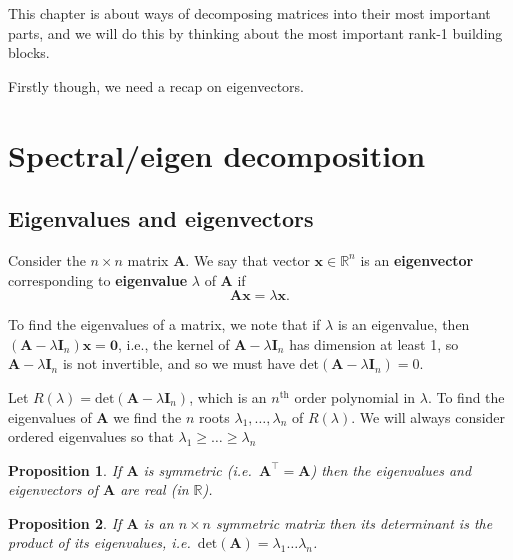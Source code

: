 \documentclass[
]{book}
\newtheorem{proposition}{Proposition}[chapter]
\theoremstyle{definition}
\theoremstyle{definition}
\theoremstyle{definition}
\theoremstyle{definition}
\theoremstyle{remark}
\begin{document}
This chapter is about ways of decomposing matrices into their most important parts, and we will do this by thinking about the most important rank-1 building blocks.

Firstly though, we need a recap on eigenvectors.

\section{Spectral/eigen decomposition}\label{spectraleigen-decomposition}

\subsection{Eigenvalues and eigenvectors}\label{eigenvalues-and-eigenvectors}

Consider the \(n\times n\) matrix \(\mathbf A\).
We say that
vector \(\mathbf x\in \mathbb{R}^n\) is an \textbf{eigenvector} corresponding to \textbf{eigenvalue} \(\lambda\) of \(\mathbf A\) if
\[\mathbf A\mathbf x= \lambda \mathbf x.\]

To find the eigenvalues of a matrix, we note that if \(\lambda\) is an eigenvalue, then \((\mathbf A-\lambda \mathbf I_n)\mathbf x={\boldsymbol 0}\), i.e., the kernel of \(\mathbf A-\lambda \mathbf I_n\) has dimension at least 1, so \(\mathbf A-\lambda \mathbf I_n\) is not invertible, and so we must have \(\text{det}(\mathbf A-\lambda \mathbf I_n)=0\).

Let \(R(\lambda )=\text{det}(\mathbf A-\lambda \mathbf I_n)\), which is an \(n^{\text{th}}\) order polynomial in \(\lambda\). To find the eigenvalues of \(\mathbf A\) we find the \(n\) roots \(\lambda _1, \dots , \lambda _n\) of \(R(\lambda )\). We will always consider ordered eigenvalues so that \(\lambda _1\geq \dots \geq \lambda _n\)

\begin{proposition}
\protect\hypertarget{prp:unnamed-chunk-2}{}\label{prp:unnamed-chunk-2}If \(\mathbf A\) is symmetric (i.e.~\(\mathbf A^\top =\mathbf A\)) then the
eigenvalues and eigenvectors of \(\mathbf A\) are \emph{real} (in \(\mathbb{R}\)).
\end{proposition}

\begin{proposition}
\protect\hypertarget{prp:deteig}{}\label{prp:deteig}If \(\mathbf A\) is an \(n \times n\) symmetric matrix
then its determinant is the product of its eigenvalues, i.e.~\(\text{det}(\mathbf A)=\lambda _1 \dots
\lambda _n\).
\end{proposition}
\end{document}
